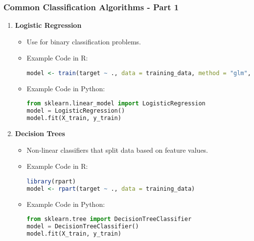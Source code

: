 \documentclass{beamer}
\begin{document}
\begin{frame}[fragile]
    \frametitle{Common Classification Algorithms - Part 1}
    \begin{enumerate}
        \item \textbf{Logistic Regression}
        \begin{itemize}
            \item Use for binary classification problems.
            \item Example Code in R:
            \begin{lstlisting}[language=R]
model <- train(target ~ ., data = training_data, method = "glm", family = "binomial")
            \end{lstlisting}
            \item Example Code in Python:
            \begin{lstlisting}[language=Python]
from sklearn.linear_model import LogisticRegression
model = LogisticRegression()
model.fit(X_train, y_train)
            \end{lstlisting}
        \end{itemize}

        \item \textbf{Decision Trees}
        \begin{itemize}
            \item Non-linear classifiers that split data based on feature values.
            \item Example Code in R:
            \begin{lstlisting}[language=R]
library(rpart)
model <- rpart(target ~ ., data = training_data)
            \end{lstlisting}
            \item Example Code in Python:
            \begin{lstlisting}[language=Python]
from sklearn.tree import DecisionTreeClassifier
model = DecisionTreeClassifier()
model.fit(X_train, y_train)
            \end{lstlisting}
        \end{itemize}
    \end{enumerate}
\end{frame}
\end{document}
